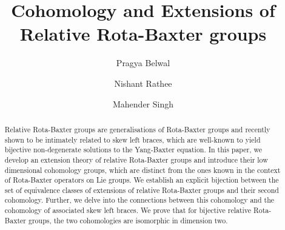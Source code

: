 \documentclass[11pt]{amsart}
\theoremstyle{thrm}
\theoremstyle{plain}
\theoremstyle{definition}
\numberwithin{equation}{section}
\begin{document}
\title{Cohomology and Extensions of Relative Rota-Baxter groups}

\author{Pragya Belwal}
\address{Department of Mathematical Sciences, Indian Institute of Science Education and Research (IISER) Mohali, Sector 81, SAS Nagar, P O Manauli, Punjab 140306, India} 

\author{Nishant Rathee}
\address{Department of Mathematical Sciences, Indian Institute of Science Education and Research (IISER) Mohali, Sector 81, SAS Nagar, P O Manauli, Punjab 140306, India} 

\author{Mahender Singh}
\address{Department of Mathematical Sciences, Indian Institute of Science Education and Research (IISER) Mohali, Sector 81, SAS Nagar, P O Manauli, Punjab 140306, India} 


	
\begin{abstract}
Relative Rota-Baxter groups are generalisations of Rota-Baxter groups and recently shown to be intimately related to skew left braces, which are well-known to yield bijective non-degenerate solutions to the Yang-Baxter equation. In this paper, we develop an extension theory of relative Rota-Baxter groups and introduce their low dimensional cohomology groups, which are distinct from the ones known in the context of Rota-Baxter operators on Lie groups. We establish an explicit bijection between the set of equivalence classes of extensions of relative Rota-Baxter groups and their second cohomology. Further, we delve into the connections between this cohomology and the cohomology of associated skew left braces. We prove that for bijective relative Rota-Baxter groups, the two cohomologies are isomorphic in dimension two.
\end{abstract}	

\maketitle
\end{document}
